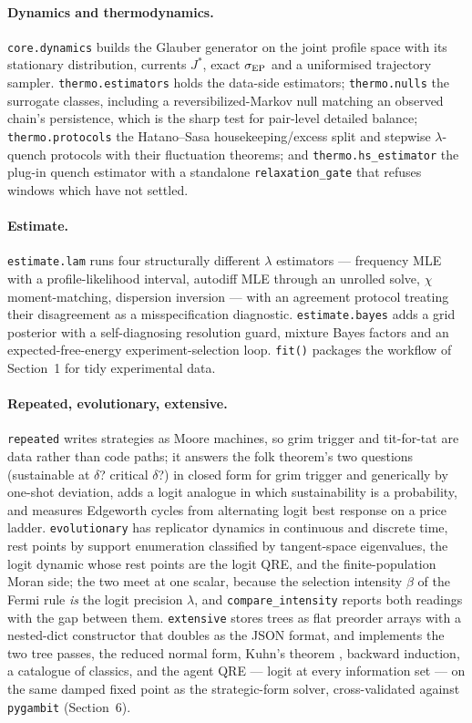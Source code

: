 \paragraph{Dynamics and thermodynamics.} \texttt{core.dynamics} builds the
Glauber generator on the joint profile space with its stationary distribution,
currents $J^*$, exact $\sigma_{\mathrm{EP}}$ and a uniformised trajectory sampler.
\texttt{thermo.estimators} holds the data-side estimators;
\texttt{thermo.nulls} the surrogate classes, including a reversibilized-Markov
null matching an observed chain's persistence, which is the sharp test for
pair-level detailed balance; \texttt{thermo.protocols} the Hatano--Sasa
\citep{hatanosasa2001} housekeeping/excess split and stepwise $\lambda$-quench
protocols with their fluctuation theorems; and \texttt{thermo.hs\_estimator} the
plug-in quench estimator with a standalone \texttt{relaxation\_gate} that refuses
windows which have not settled.

\paragraph{Estimate.} \texttt{estimate.lam} runs four structurally different
$\lambda$ estimators --- frequency MLE with a profile-likelihood interval,
autodiff MLE through an unrolled solve, $\chi$ moment-matching, dispersion
inversion --- with an agreement protocol treating their disagreement as a
misspecification diagnostic. \texttt{estimate.bayes} adds a grid posterior with a
self-diagnosing resolution guard, mixture Bayes factors and an
expected-free-energy experiment-selection loop. \texttt{fit()} packages the
workflow of Section~1 for tidy experimental data.

\paragraph{Repeated, evolutionary, extensive.} \texttt{repeated} writes
strategies as Moore machines, so grim trigger and tit-for-tat are data rather
than code paths; it answers the folk theorem's two questions (sustainable at
$\delta$? critical $\delta$?) in closed form for grim trigger and generically by
one-shot deviation, adds a logit analogue in which sustainability is a
probability, and measures Edgeworth cycles \citep{maskin1988} from alternating
logit best response on a price ladder. \texttt{evolutionary} has replicator
dynamics in continuous and discrete time, rest points by support enumeration
classified by tangent-space eigenvalues, the logit dynamic whose rest points are
the logit QRE, and the finite-population Moran side; the two meet at one scalar,
because the selection intensity $\beta$ of the Fermi rule \emph{is} the logit
precision $\lambda$, and \texttt{compare\_intensity} reports both readings with
the gap between them. \texttt{extensive} stores trees as flat preorder arrays
with a nested-dict constructor that doubles as the JSON format, and implements
the two tree passes, the reduced normal form, Kuhn's theorem \citep{kuhn1953},
backward induction, a catalogue of classics, and the agent QRE
\citep{mckelvey1998} --- logit at every information set --- on the same damped
fixed point as the strategic-form solver, cross-validated against
\texttt{pygambit} (Section~6).

